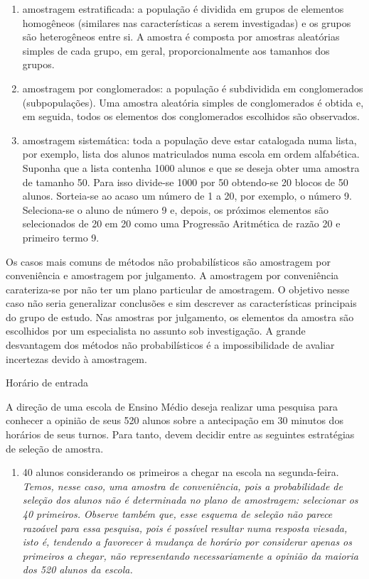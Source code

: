 {{\begin{enumerate}
\item {} 
amostragem estratificada: a população é dividida em grupos de elementos homogêneos (similares nas características a serem investigadas) e os grupos são heterogêneos entre si. A amostra é composta por amostras aleatórias simples de cada grupo, em geral, proporcionalmente aos tamanhos dos grupos.

\item {} 
amostragem por conglomerados: a população é subdividida em conglomerados (subpopulações). Uma amostra aleatória simples de conglomerados é obtida e, em seguida, todos os elementos dos conglomerados escolhidos são observados.

\item {} 
amostragem sistemática: toda a população deve estar catalogada numa lista, por exemplo, lista dos alunos matriculados numa escola em ordem alfabética. Suponha que a lista contenha 1000 alunos e que se deseja obter uma amostra de tamanho 50. Para isso divide-se 1000 por 50 obtendo-se 20 blocos de 50 alunos. Sorteia-se ao acaso um número de 1 a 20, por exemplo, o número 9. Seleciona-se o aluno de número 9 e, depois, os próximos elementos são selecionados de 20 em 20 como uma Progressão Aritmética de razão 20 e primeiro termo 9.

\end{enumerate}

Os casos mais comuns de métodos não probabilísticos são amostragem por conveniência e amostragem por julgamento. A amostragem por conveniência carateriza-se por não ter um plano particular de amostragem. O objetivo nesse caso não seria generalizar conclusões e sim descrever as características principais do grupo de estudo.  Nas amostras por julgamento, os elementos da amostra são escolhidos por um especialista no assunto sob investigação. A grande desvantagem dos métodos não probabilísticos é a impossibilidade de avaliar incertezas devido à amostragem.

\begin{example}{Horário de entrada}

A direção de uma escola de Ensino Médio deseja realizar uma pesquisa para conhecer a opinião de seus 520 alunos sobre a antecipação em 30 minutos dos horários de seus turnos. Para tanto, devem decidir entre as seguintes estratégias de seleção de amostra.
\begin{enumerate}
\item {} 
40 alunos considerando os primeiros a chegar na  escola na segunda-feira.  \emph{Temos, nesse caso, uma amostra de conveniência, pois a probabilidade de seleção dos alunos não é determinada no plano de amostragem: selecionar os 40 primeiros. Observe também que, esse esquema de seleção não parece razoável para essa pesquisa, pois é possível resultar numa resposta viesada, isto é, tendendo a favorecer à mudança de horário por considerar apenas os primeiros a chegar, não representando necessariamente a opinião da maioria dos 520 alunos da escola.}


\end{enumerate}
\end{example}}}
